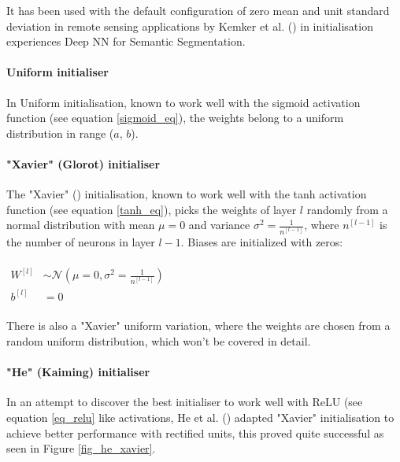 It has been used with the default configuration of zero mean and unit standard deviation in remote sensing applications by Kemker et al. (\cite{kemker2018algorithms}) in initialisation experiences Deep \gls{NN} for Semantic Segmentation.

\paragraph{Uniform initialiser} In Uniform initialisation, known to work well with the sigmoid activation function (see equation \ref{sigmoid_eq}), the weights belong to a uniform distribution in range ($a$, $b$).

\paragraph{"Xavier" (Glorot) initialiser} The "Xavier" (\cite{pmlrv9glorot10a}) initialisation, known to work well with the tanh activation function (see equation \ref{tanh_eq}), picks the weights of layer $l$ randomly from a normal distribution with mean $\mu = 0$ and variance $\sigma^2 = \frac{1}{n^{[l-1]}}$, where $n^{[l-1]}$ is the number of neurons in layer $l-1$. Biases are initialized with zeros:
\paragraph{}

$\begin{aligned}W^{[l]} &\sim \mathcal{N}(\mu=0,\sigma^2 = \frac{1}{n^{[l-1]}})\\ b^{[l]} &= 0\end{aligned}$

\paragraph{}

There is also a  "Xavier" uniform variation, where the weights are chosen from a random uniform distribution, which won't be covered in detail.

\paragraph{"He" (Kaiming) initialiser} In an attempt to discover the best initialiser to work well with \gls{ReLU} (see equation \ref{eq_relu} like activations, He et al. (\cite{He_2015_ICCV}) adapted "Xavier" initialisation to achieve better performance with rectified units, this proved quite successful as seen in Figure \ref{fig_he_xavier}.

